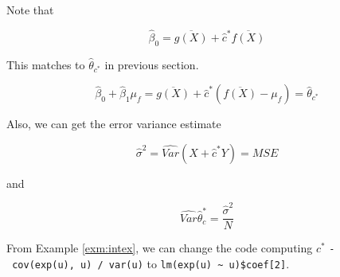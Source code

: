 \documentclass[]{book}
\newenvironment{Shaded}{\begin{snugshade}}{\end{snugshade}}
\newcommand{\CommentTok}[1]{\textcolor[rgb]{0.56,0.35,0.01}{\textit{#1}}}
\newcommand{\DataTypeTok}[1]{\textcolor[rgb]{0.13,0.29,0.53}{#1}}
\newcommand{\DecValTok}[1]{\textcolor[rgb]{0.00,0.00,0.81}{#1}}
\newcommand{\ErrorTok}[1]{\textcolor[rgb]{0.64,0.00,0.00}{\textbf{#1}}}
\newcommand{\KeywordTok}[1]{\textcolor[rgb]{0.13,0.29,0.53}{\textbf{#1}}}
\newcommand{\NormalTok}[1]{#1}
\newcommand{\OperatorTok}[1]{\textcolor[rgb]{0.81,0.36,0.00}{\textbf{#1}}}
\newcommand{\StringTok}[1]{\textcolor[rgb]{0.31,0.60,0.02}{#1}}
\theoremstyle{definition}
\theoremstyle{definition}
\theoremstyle{definition}
\theoremstyle{remark}
\begin{document}
Note that

\[\hat\beta_0 = \overline{g(X)} + \hat{c}^{\ast} \overline{f(X)}\]

This matches to \(\hat\theta_{c^{\ast}}\) in previous section.

\begin{equation}
  \hat\beta_0 + \hat\beta_1 \mu_f = \overline{g(X)} + \hat{c}^{\ast} (\overline{f(X)} - \mu_f) = \hat\theta_{c^{\ast}}
  \label{eq:controlreg}
\end{equation}

Also, we can get the error variance estimate

\[\hat\sigma^2 = \widehat{Var}(X + \hat{c}^{\ast}Y) = MSE\]

and

\[\widehat{Var}\hat\theta_c^{\ast} = \frac{\hat\sigma^2}{N}\]

From Example \ref{exm:intex}, we can change the code computing \(c^{\ast}\) \texttt{-\ cov(exp(u),\ u)\ /\ var(u)} to \texttt{lm(exp(u)\ \textasciitilde{}\ u)\$coef{[}2{]}}.

\begin{Shaded}
\end{Shaded}
\end{document}
